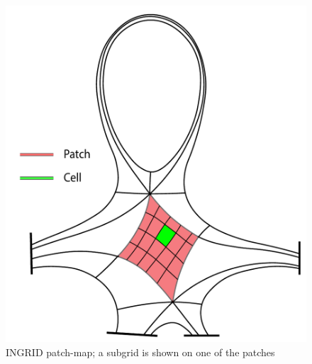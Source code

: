 





\begin{figure}[H]
    \centering
    \includegraphics[width=0.5\linewidth]{figures/geometry_render.pdf}  %
    \caption{INGRID patch-map; a subgrid is shown on one of the patches}
    \label{fig:patchmap_subgrid}
\end{figure}

